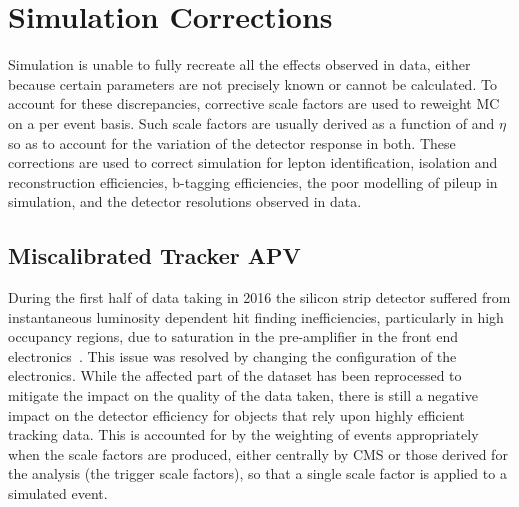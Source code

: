 %
%
\section{Simulation Corrections}\label{sec:simCorrections}
Simulation is unable to fully recreate all the effects observed in data, either because certain parameters are not precisely known or cannot be calculated.
To account for these discrepancies, corrective scale factors are used to reweight MC on a per event basis.
Such scale factors are usually derived as a function of \pt and $\eta$ so as to account for the variation of the detector response in both.
These corrections are used to correct simulation for lepton identification, isolation and reconstruction efficiencies, b-tagging efficiencies, the poor modelling of pileup in simulation, and the detector resolutions observed in data.

\subsection{Miscalibrated Tracker APV}\label{subsec:hipEffect}
During the first half of data taking in 2016 the silicon strip detector suffered from instantaneous luminosity dependent  hit finding inefficiencies, particularly in high occupancy regions, due to saturation in the pre-amplifier in the front end electronics~\cite{Fiori:2016ebh}.
This issue was resolved by changing the configuration of the electronics.
While the affected part of the dataset has been reprocessed to mitigate the impact on the quality of the data taken, there is still a negative impact on the detector efficiency for objects that rely upon highly efficient tracking data.
This is accounted for by the weighting of events appropriately when the scale factors are produced, either centrally by CMS or those derived for the analysis (\ie the trigger scale factors), so that a single scale factor is applied to a simulated event.


